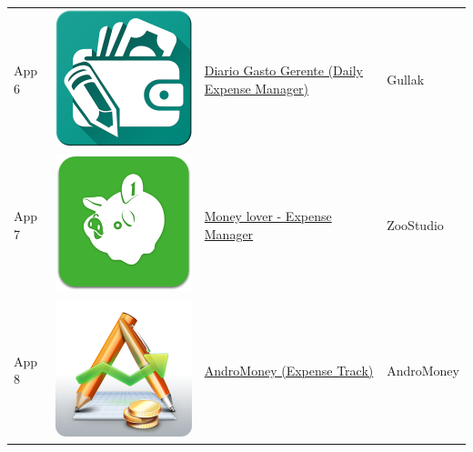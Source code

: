 \begin{tabular}{ | l | c | l | l | }
App 6 & \includegraphics[scale=0.05]{A06_icon.png} & \href{https://play.google.com/store/apps/details?id=com.techahead.ExpenseManager}{Diario Gasto Gerente (Daily Expense Manager)} & Gullak \\

App 7 & \includegraphics[scale=0.05]{A07_icon.png} & \href{https://play.google.com/store/apps/details?id=com.bookmark.money}{Money lover - Expense Manager} & ZooStudio   \\

App 8 & \includegraphics[scale=0.05]{A08_icon.png} & \href{https://play.google.com/store/apps/details?id=com.kpmoney.android}{AndroMoney (Expense Track)} & AndroMoney \\


\end{tabular}
